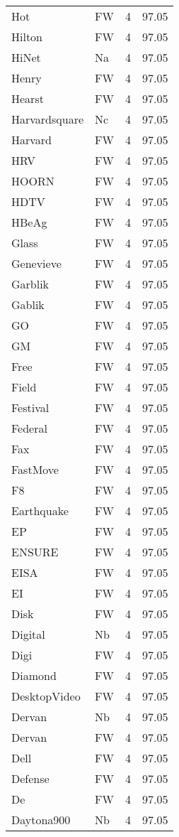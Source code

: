 \documentclass[twocolumn]{book}
\begin{document}
\begin{supertabular}{llrr}
Hot & FW & 4 &  97.05\\
Hilton & FW & 4 &  97.05\\
HiNet & Na & 4 &  97.05\\
Henry & FW & 4 &  97.05\\
Hearst & FW & 4 &  97.05\\
Harvardsquare & Nc & 4 &  97.05\\
Harvard & FW & 4 &  97.05\\
HRV & FW & 4 &  97.05\\
HOORN & FW & 4 &  97.05\\
HDTV & FW & 4 &  97.05\\
HBeAg & FW & 4 &  97.05\\
Glass & FW & 4 &  97.05\\
Genevieve & FW & 4 &  97.05\\
Garblik & FW & 4 &  97.05\\
Gablik & FW & 4 &  97.05\\
GO & FW & 4 &  97.05\\
GM & FW & 4 &  97.05\\
Free & FW & 4 &  97.05\\
Field & FW & 4 &  97.05\\
Festival & FW & 4 &  97.05\\
Federal & FW & 4 &  97.05\\
Fax & FW & 4 &  97.05\\
FastMove & FW & 4 &  97.05\\
F8 & FW & 4 &  97.05\\
Earthquake & FW & 4 &  97.05\\
EP & FW & 4 &  97.05\\
ENSURE & FW & 4 &  97.05\\
EISA & FW & 4 &  97.05\\
EI & FW & 4 &  97.05\\
Disk & FW & 4 &  97.05\\
Digital & Nb & 4 &  97.05\\
Digi & FW & 4 &  97.05\\
Diamond & FW & 4 &  97.05\\
DesktopVideo & FW & 4 &  97.05\\
Dervan & Nb & 4 &  97.05\\
Dervan & FW & 4 &  97.05\\
Dell & FW & 4 &  97.05\\
Defense & FW & 4 &  97.05\\
De & FW & 4 &  97.05\\
Daytona900 & Nb & 4 &  97.05\\

\end{supertabular}
\end{document}
